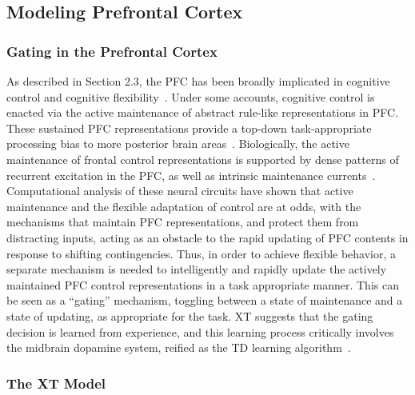 \subsection{Modeling Prefrontal Cortex} 
 
\subsubsection{Gating in the Prefrontal Cortex} 

As described in Section 2.3, the PFC has been broadly implicated in cognitive control and cognitive flexibility~\cite{Stuss:2000:WCSTLesion,Stuss:2001:StroopLesion}.  Under some accounts, cognitive control is enacted via the active maintenance of abstract rule-like representations in PFC.  These sustained PFC representations provide a top-down task-appropriate processing bias to more posterior brain areas~\cite{CohenJD:1990:Stroop}.  Biologically, the active maintenance of frontal control representations is supported by dense patterns of recurrent excitation in the PFC, as well as intrinsic maintenance currents~\cite{Goldman-RakicPS:1987:PFC_Maintenance}.  Computational analysis of these neural circuits have shown that active maintenance and the flexible adaptation of control are at odds, with the mechanisms that maintain PFC representations, and protect them from distracting inputs, acting as an obstacle to the rapid updating of PFC contents in response to shifting contingencies.  Thus, in order to achieve flexible behavior, a separate mechanism is needed to intelligently and rapidly update the actively maintained PFC control representations in a task appropriate manner.  This can be seen as a ``gating'' mechanism, toggling between a state of maintenance and a state of updating, as appropriate for the task.  XT suggests that the gating decision is learned from experience, and this learning process critically involves the midbrain dopamine system, reified as the TD learning algorithm~\cite{BraverTS:2000:Control,RougierNP:2005:XT,BartoAG:1994:TDLearning}.

\subsubsection{The XT Model} 



